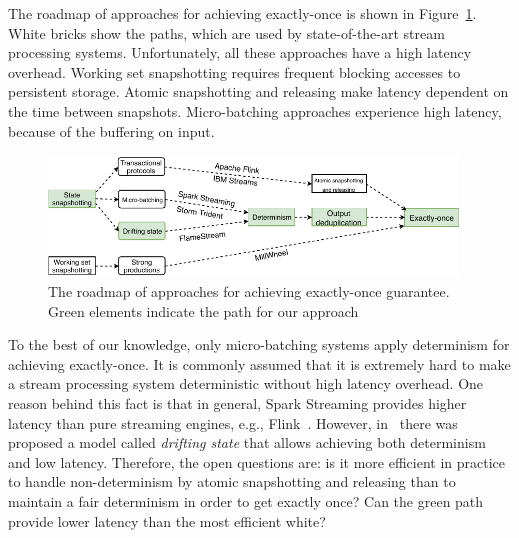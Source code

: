 The roadmap of approaches for achieving exactly-once is shown in Figure~\ref{roadmap}. White bricks show the paths, which are used by state-of-the-art stream processing systems. Unfortunately, all these approaches have a high latency overhead. Working set snapshotting requires frequent blocking accesses to persistent storage. Atomic snapshotting and releasing make latency dependent on the time between snapshots. Micro-batching approaches experience high latency, because of the buffering on input.    

\begin{figure}[htbp]
  \centering
  \includegraphics[width=0.97\textwidth]{pics/roadmap}
  \caption{The roadmap of approaches for achieving exactly-once guarantee. Green elements indicate the path for our approach}
  \label {roadmap}
\end{figure} 

To the best of our knowledge, only micro-batching systems apply determinism for achieving exactly-once. It is commonly assumed that it is extremely hard to make a stream processing system deterministic without high latency overhead. One reason behind this fact is that in general, Spark Streaming provides higher latency than pure streaming engines, e.g., Flink~\cite{karimov2018benchmarking}. However, in~\cite{we2018adbis} there was proposed a model called {\em drifting state} that allows achieving both determinism and low latency. Therefore, the open questions are: is it more efficient in practice to handle non-determinism by atomic snapshotting and releasing than to maintain a fair determinism in order to get exactly once? Can the green path provide lower latency than the most efficient white?